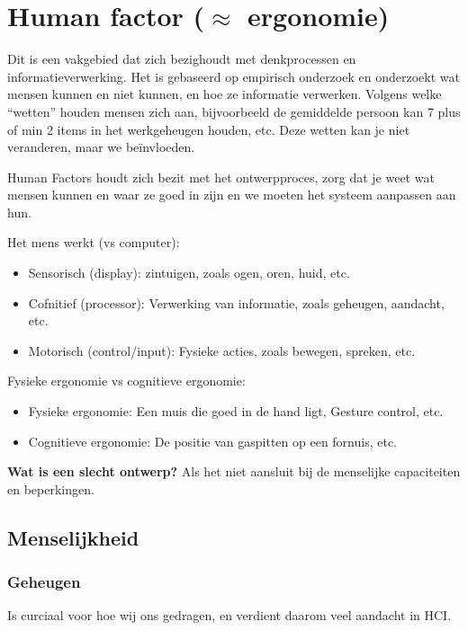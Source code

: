 \documentclass[nonacm, sigconf, balance=true]{acmart}
\begin{document}
    \onecolumn


    \section{Human factor ($\approx$ ergonomie)}
    Dit is een vakgebied dat zich bezighoudt met denkprocessen en informatieverwerking.
    Het is gebaseerd op empirisch onderzoek en onderzoekt wat mensen kunnen en niet kunnen, en hoe ze informatie verwerken.
    Volgens welke ``wetten'' houden mensen zich aan, bijvoorbeeld de gemiddelde persoon kan 7 plus of min 2 items in het werkgeheugen houden, etc.
    Deze wetten kan je niet veranderen, maar we beïnvloeden.

    Human Factors houdt zich bezit met het ontwerpproces, zorg dat je weet wat mensen kunnen en waar ze goed in zijn en we moeten het systeem aanpassen aan hun.


    Het mens werkt (vs computer):
    \begin{itemize}
        \item Sensorisch (display): zintuigen, zoals ogen, oren, huid, etc.
        \item Cofnitief (processor): Verwerking van informatie, zoals geheugen, aandacht, etc.
        \item Motorisch (control/input): Fysieke acties, zoals bewegen, spreken, etc.
    \end{itemize}

    Fysieke ergonomie vs cognitieve ergonomie:
    \begin{itemize}
        \item Fysieke ergonomie: Een muis die goed in de hand ligt, Gesture control, etc.
        \item Cognitieve ergonomie: De positie van gaspitten op een fornuis, etc.
    \end{itemize}

    \textbf{Wat is een slecht ontwerp?} Als het niet aansluit bij de menselijke capaciteiten en beperkingen.

    \subsection{Menselijkheid}

    \subsubsection{Geheugen}
    Is curciaal voor hoe wij ons gedragen, en verdient daarom veel aandacht in HCI.\\
\end{document}
